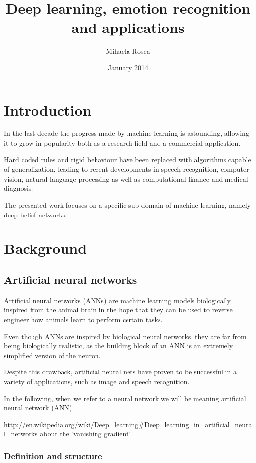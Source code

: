 \documentclass[11pt, fleqn, twoside]{article}
\title{Deep learning, emotion recognition and applications}
\author{Mihaela Rosca}
\date{January 2014}
\begin{document}
\maketitle
\tableofcontents
\listoffigures

\section{Introduction}
  In the last decade the progress made by machine learning is astounding, allowing it to grow in popularity both as a research field  and a commercial application.

  Hard coded rules and rigid behaviour have been replaced with algorithms capable of generalization, leading to recent developments in speech recognition, computer vision, natural language processing as well as computational finance and medical diagnosis.

  The presented work focuses on a specific sub domain of machine learning, namely deep belief networks.




\section{Background}


\subsection{Artificial neural networks}

  Artificial neural networks (ANNs) are machine learning models biologically inspired from the animal brain in the hope that they can be used to reverse engineer how animals learn to perform certain tasks.

  Even though ANNs are inspired by biological neural networks, they are far from being biologically realistic, as the building block of an ANN is an extremely simplified version of the neuron.

  Despite this drawback, artificial neural nets have proven to be successful in a variety of applications, such as image and speech recognition.

  In the following, when we refer to a neural network we will be meaning artificial neural network (ANN).

  http://en.wikipedia.org/wiki/Deep_learning#Deep_learning_in_artificial_neural_networks
  about the 'vanishing gradient'

\subsubsection {Definition and structure}
\end{document}
